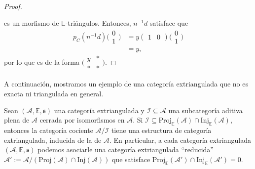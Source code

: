 \documentclass[tesis]{subfiles}
\begin{document}
\begin{proof}
\begin{center}
    \end{center}
    es un morfismo de $\mathbb{E}$-triángulos. Entonces, $n^{-1}d$ satisface que
    \begin{align*}
        p_C(n^{-1}d)\big(\begin{smallmatrix} 0 \\ 1 \end{smallmatrix}\big) &= y(\begin{smallmatrix} 1 &0 \end{smallmatrix})\big(\begin{smallmatrix} 0 \\ 1 \end{smallmatrix}\big) \\
                                                                           &= y,
    \end{align*}
    por lo que es de la forma $\big( \begin{smallmatrix} y &\ast \\ \ast &\ast \end{smallmatrix}\big)$.
\end{proof}

A continuación, mostramos un ejemplo de una categoría extriangulada que no es exacta ni triangulada en general.

\begin{Prop}\cite[Proposition 3.30]{NakaokaPalu}\label{NakaokaPalu-3.30}
    Sean $(\mathscr{A},\mathbb{E},\mathfrak{s})$ una categoría extriangulada y $\mathscr{I}\subseteq\mathscr{A}$ una subcategoría aditiva plena de $\mathscr{A}$ cerrada por isomorfismos en $\mathscr{A}$. Si $\mathscr{I}\subseteq\text{Proj}_\mathbb{E}(\mathscr{A})\cap\text{Inj}_\mathbb{E}(\mathscr{A})$, entonces la categoría cociente $\mathscr{A}/\mathscr{I}$ tiene una estructura de categoría extriangulada, inducida de la de $\mathscr{A}$. En particular, a cada categoría extriangulada $(\mathscr{A},\mathbb{E},\mathfrak{s})$ podemos asociarle una categoría extriangulada ``reducida'' $\mathscr{A}' := \mathscr{A}/(\text{Proj}(\mathscr{A})\cap\text{Inj}(\mathscr{A}))$ que satisface $\text{Proj}_\mathbb{E}(\mathscr{A}')\cap\text{Inj}_\mathbb{E}(\mathscr{A}')=0$.
\end{Prop}
\end{document}
